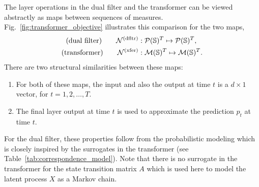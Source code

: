 \documentclass[twoside,11pt]{article}
\def\Fig#1{Fig.~\ref{#1}}
\def\clP{{\cal P}}
\def\Fig#1{Fig.~\ref{#1}}
\def\bS{\begin{slide}}
\def\clP{{\cal P}}
\def\clP{{\cal P}}
\def\bS{\mathbb{S}}
\def\xfer{{\text{\rm (xfer)}}}
\def\dfltr{{\text{\rm (dfltr)}}}
\begin{document}
The layer operations in the dual filter and the transformer can be
viewed abstractly as maps between sequences of
measures. \Fig{fig:transformer_objective} illustrates this
comparison for the two maps,
\begin{align*}
  \text{(dual filter)}\qquad {\cal N}^\dfltr&:\clP(\bS)^T \mapsto \clP(\bS)^T,\\
  \text{(transformer)}\qquad
{\cal N}^\xfer&:{\cal M}(\bS)^T \mapsto {\cal M}(\bS)^T.
\end{align*}
There are two structural similarities between these maps:
\begin{enumerate}
\item For both of these maps, the input and also the output at time $t$ is a $d\times 1$ vector, for $t=1,2,\hdots,T$.
\item The final layer output at time $t$ is used to approximate the prediction $p_t$ at time $t$.
\end{enumerate}
For the dual filter, these properties follow from the probabilistic modeling which is closely inspired by the surrogates in the transformer (see Table~\ref{tab:correspondence_model}).  
Note that there is no surrogate in the transformer for the state transition matrix $A$ which is used here to model the latent process $X$ as a Markov chain.
\end{document}

